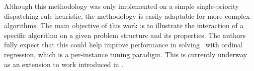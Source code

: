 Although this methodology was only implemented on a simple single-priority dispatching rule heuristic, the methodology is easily adaptable for more complex algorithms. The main objective of this work is to illustrate the interaction of a specific algorithm on a given problem structure and its properties.
The authors fully expect that this could help improve performance in solving \JSP\ with ordinal regression, which is a per-instance tuning paradigm. This is currently underway as an extension to work introduced in \cite{InRu11a}.


